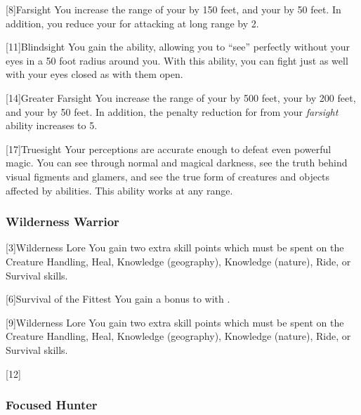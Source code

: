             [8]{Farsight}
            You increase the range of your  by 150 feet, and your  by 50 feet.
            In addition, you reduce your  for attacking at long range by 2.

            [11]{Blindsight}
            You gain the  ability, allowing you to ``see'' perfectly without your eyes in a 50 foot radius around you.
            With this ability, you can fight just as well with your eyes closed as with them open.

            [14]{Greater Farsight}
            You increase the range of your  by 500 feet, your  by 200 feet, and your  by 50 feet.
            In addition, the penalty reduction for  from your \textit{farsight} ability increases to 5.

            [17]{Truesight} 
            Your perceptions are accurate enough to defeat even powerful magic.
            You can see through normal and magical darkness, see the truth behind visual figments and glamers, and see the true form of creatures and objects affected by  abilities.
            This ability works at any range.

        \subsubsection{Wilderness Warrior}
            [3]{Wilderness Lore} You gain two extra skill points which must be spent on the Creature Handling, Heal, Knowledge (geography), Knowledge (nature), Ride, or Survival skills.

            [6]{Survival of the Fittest}
            You gain a  bonus to  with .

            [9]{Wilderness Lore} You gain two extra skill points which must be spent on the Creature Handling, Heal, Knowledge (geography), Knowledge (nature), Ride, or Survival skills.

            [12]{} 

        \subsubsection{Focused Hunter}

